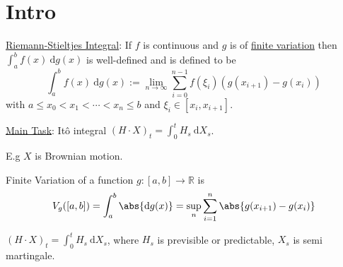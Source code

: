 \chapter{Intro}

\underline{Riemann-Stieltjes Integral}: If $f$ is continuous and $g$ is of \underline{finite variation} then $\int_{a}^{b} f(x) ~ \mathrm{d}g(x)$ is well-defined and is defined to be 
$$
    \int_{a}^{b} f(x) ~ \mathrm{d}g(x):=\lim_{n\to \infty} \sum_{i=0}^{n-1}f(\xi_{i})\left(g(x_{i+1}) - g(x_{i})\right)
$$
with $a \leq x_{0} < x_{1} < \cdots < x_{n} \leq b$ and $\xi_{i} \in [x_{i}, x_{i+1}]$.

\underline{Main Task}: It\^o integral $(H\cdot X)_{t} = \int_{0}^{t} H_{s} ~\mathrm{d}X_{s}$.

E.g $X$ is Brownian motion.


Finite Variation of a function $g:[a,b] \to \mathbb{R}$ is 
$$
    V_{g}([a,b]) = \int_{a}^{b} \abs{ \mathrm{d}g(x)} = \sup_{n}\sum_{i=1}^{n}\abs{g(x_{i+1}) - g(x_{i})}
$$


$(H\cdot X)_{t} = \int_{0}^{t} H_{s}~\mathrm{d}X_{s}$, where $H_{s}$ is previsible or predictable, $X_{s}$ is semi martingale.


